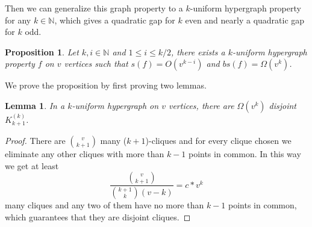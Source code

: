 \documentclass[psamsfonts]{amsart}
\newtheorem{prop}[theorem]{Proposition}
\newtheorem{lem}[theorem]{Lemma}
\theoremstyle{definition}
\theoremstyle{remark}
\numberwithin{equation}{section}
\begin{document}
	Then we can generalize this graph property to a $k$-uniform hypergraph property for any $k \in \mathbb{N}$, which gives a quadratic gap for $k$ even and nearly a quadratic gap for $k$ odd.
		\begin{prop}
		Let $k,i \in \mathbb{N}$ and $1 \leq i \leq k/2$, there exists a $k$-uniform hypergraph property $f$ on $v$ vertices such that $s(f) = O(v^{k-i})$ and $bs(f) = \Omega (v^{k})$.
	\end{prop}
	We prove the proposition by first proving two lemmas.
	\begin{lem}
		In a $k$-uniform hypergraph on $v$ vertices, there are $\Omega (v^k)$ disjoint $K_{k+1}^{(k)}$.
	\end{lem}
	\begin{proof}
		There are $v \choose{k+1}$  many ($k+1$)-cliques and for every clique chosen we eliminate any other cliques with more than $k-1$ points in common. In this way we get at least
		\begin{equation}
			\frac{{v \choose{k+1}}}{{k+1 \choose{k}}(v-k)} = c*v^{k} \nonumber
		\end{equation}		 
	many cliques and any two of them have no more than $k-1$ points in common, which guarantees that they are disjoint cliques.
	\end{proof}
\end{document}
